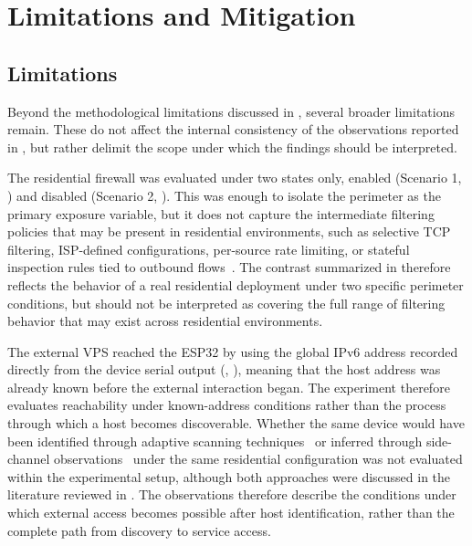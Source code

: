 \chapter{Limitations and Mitigation}\label{chap:limitations-mitigation}

\section{Limitations}\label{sec:limitations}

Beyond the methodological limitations discussed in , several broader limitations remain. These do not affect the internal consistency of the observations reported in , but rather delimit the scope under which the findings should be interpreted.

The residential firewall was evaluated under two states only, enabled (Scenario 1, ) and disabled (Scenario 2, ). This was enough to isolate the perimeter as the primary exposure variable, but it does not capture the intermediate filtering policies that may be present in residential environments, such as selective TCP filtering, ISP-defined configurations, per-source rate limiting, or stateful inspection rules tied to outbound flows~\cite{rye2025firewalls}. The contrast summarized in  therefore reflects the behavior of a real residential deployment under two specific perimeter conditions, but should not be interpreted as covering the full range of filtering behavior that may exist across residential environments.

The external VPS reached the ESP32 by using the global IPv6 address recorded directly from the device serial output (, ), meaning that the host address was already known before the external interaction began. The experiment therefore evaluates reachability under known-address conditions rather than the process through which a host becomes discoverable. Whether the same device would have been identified through adaptive scanning techniques~\cite{williams20246sense} or inferred through side-channel observations~\cite{pan2023router} under the same residential configuration was not evaluated within the experimental setup, although both approaches were discussed in the literature reviewed in . The observations therefore describe the conditions under which external access becomes possible after host identification, rather than the complete path from discovery to service access.

